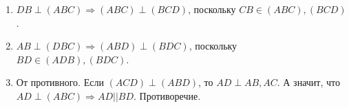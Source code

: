\begin{enumerate}
\item $DB\perp (ABC) \Rightarrow (ABC)\perp (BCD)$, поскольку $CB\in (ABC), (BCD)$.
\item $AB\perp (DBC) \Rightarrow (ABD)\perp (BDC)$, поскольку $BD\in (ADB), (BDC)$.
\item От противного. Если $(ACD)\perp(ABD)$, то $AD\perp AB, AC$. А значит, что $AD\perp (ABC) \Rightarrow AD||BD$. Противоречие.
\end{enumerate}